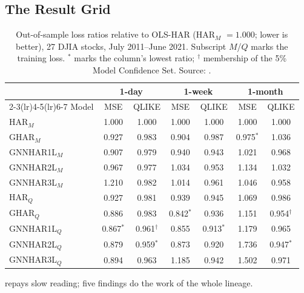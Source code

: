 \subsection{The Result Grid}\label{sec:gnn:gnnhar-results}

\begin{table}[ht]
\centering
\caption{Out-of-sample loss ratios relative to OLS-HAR (HAR$_M$ $= 1.000$; lower is better), 27 DJIA stocks, July 2011--June 2021. Subscript $M$/$Q$ marks the training loss. $^{*}$ marks the column's lowest ratio; $^{\dagger}$ membership of the 5\% Model Confidence Set. Source: \citet[Table~1, p.~15]{ZhangCucuringuDong2023}.}
\label{tab:gnn:gnnhar}
\small
\begin{tabular}{@{}lcccccc@{}}
\toprule
 & \multicolumn{2}{c}{1-day} & \multicolumn{2}{c}{1-week} & \multicolumn{2}{c}{1-month} \\
\cmidrule(lr){2-3}\cmidrule(lr){4-5}\cmidrule(lr){6-7}
Model & MSE & QLIKE & MSE & QLIKE & MSE & QLIKE \\
\midrule
HAR$_M$        & 1.000 & 1.000 & 1.000 & 1.000 & 1.000 & 1.000 \\
GHAR$_M$       & 0.927 & 0.983 & 0.904 & 0.987 & 0.975$^{*}$ & 1.036 \\
GNNHAR1L$_M$   & 0.907 & 0.979 & 0.940 & 0.943 & 1.021 & 0.968 \\
GNNHAR2L$_M$   & 0.967 & 0.977 & 1.034 & 0.953 & 1.134 & 1.032 \\
GNNHAR3L$_M$   & 1.210 & 0.982 & 1.014 & 0.961 & 1.046 & 0.958 \\
\addlinespace
HAR$_Q$        & 0.927 & 0.981 & 0.939 & 0.945 & 1.069 & 0.986 \\
GHAR$_Q$       & 0.886 & 0.983 & 0.842$^{*}$ & 0.936 & 1.151 & 0.954$^{\dagger}$ \\
GNNHAR1L$_Q$   & 0.867$^{*}$ & 0.961$^{\dagger}$ & 0.855 & 0.913$^{*}$ & 1.179 & 0.965 \\
GNNHAR2L$_Q$   & 0.879 & 0.959$^{*}$ & 0.873 & 0.920 & 1.736 & 0.947$^{*}$ \\
GNNHAR3L$_Q$   & 0.894 & 0.963 & 1.185 & 0.942 & 1.502 & 0.971 \\
\bottomrule
\end{tabular}
\end{table}

 repays slow reading; five findings do the work of the whole lineage.

